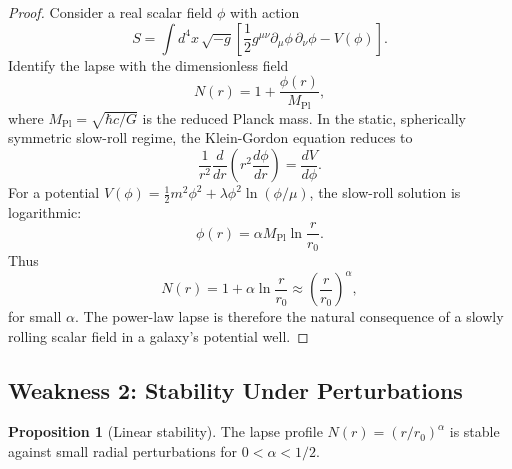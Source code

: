 \documentclass[11pt,a4paper]{article}
\theoremstyle{definition}
\newtheorem{proposition}[theorem]{Proposition}
\newcommand{\Pl}{\mathrm{Pl}}
\begin{document}
\begin{proof}
Consider a real scalar field $\phi$ with action
\begin{equation}
    S = \int d^4x\,\sqrt{-g}\left[\frac{1}{2}g^{\mu\nu}\partial_\mu\phi\,\partial_\nu\phi - V(\phi)\right].
\end{equation}
Identify the lapse with the dimensionless field
\begin{equation}
    N(r) = 1 + \frac{\phi(r)}{M_{\Pl}},
\end{equation}
where $M_{\Pl}=\sqrt{\hbar c/G}$ is the reduced Planck mass. In the static, spherically symmetric slow-roll regime, the Klein-Gordon equation reduces to
\begin{equation}
    \frac{1}{r^2}\frac{d}{dr}\left(r^2\frac{d\phi}{dr}\right) = \frac{dV}{d\phi}.
\end{equation}
For a potential $V(\phi)=\frac{1}{2}m^2\phi^2+\lambda\phi^2\ln(\phi/\mu)$, the slow-roll solution is logarithmic:
\begin{equation}
    \phi(r) = \alpha M_{\Pl}\ln\frac{r}{r_0}.
\end{equation}
Thus
\begin{equation}
    N(r) = 1 + \alpha\ln\frac{r}{r_0} \approx \left(\frac{r}{r_0}\right)^\alpha,
\end{equation}
for small $\alpha$. The power-law lapse is therefore the natural consequence of a slowly rolling scalar field in a galaxy's potential well.
\end{proof}

\subsection{Weakness 2: Stability Under Perturbations}

\begin{proposition}[Linear stability]
The lapse profile $N(r)=(r/r_0)^\alpha$ is stable against small radial perturbations for $0<\alpha<1/2$.
\end{proposition}
\end{document}
